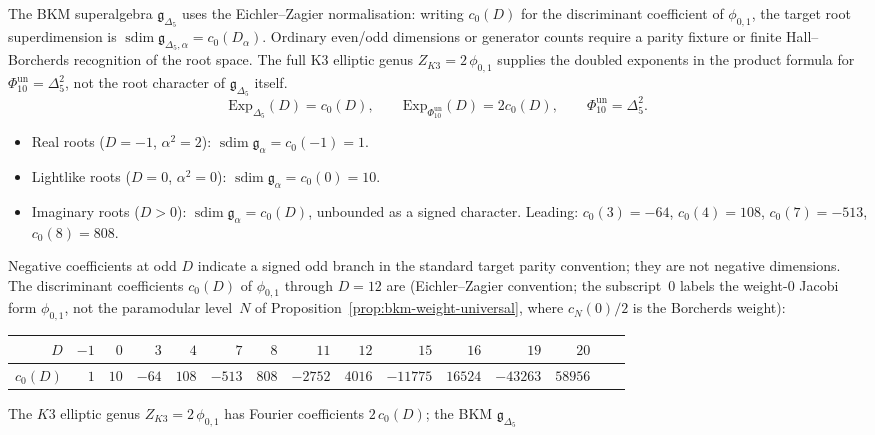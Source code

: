 \begin{proposition}
\label{prop:bkm-roots}
The BKM superalgebra $\mathfrak{g}_{\Delta_5}$ uses the
Eichler--Zagier normalisation: writing $c_0(D)$ for the
discriminant coefficient of $\phi_{0,1}$, the target root
superdimension is
\(\operatorname{sdim}\mathfrak g_{\Delta_5,\alpha}=c_0(D_\alpha)\).
Ordinary even/odd dimensions or generator counts require a parity fixture
or finite Hall--Borcherds recognition of the root space. The full K3 elliptic genus
$Z_{K3}=2\,\phi_{0,1}$ supplies the doubled exponents in the
product formula for \(\Phi_{10}^{\mathrm{un}}=\Delta_5^2\), not the root
character of $\mathfrak g_{\Delta_5}$ itself.
\[
 \mathrm{Exp}_{\Delta_5}(D)=c_0(D),
 \qquad
 \mathrm{Exp}_{\Phi_{10}^{\mathrm{un}}}(D)=2c_0(D),
 \qquad
 \Phi_{10}^{\mathrm{un}}=\Delta_5^2.
\]
\begin{itemize}
\item Real roots ($D = -1$, $\alpha^2 = 2$):
 \(\operatorname{sdim}\mathfrak g_\alpha = c_0(-1) = 1\).
\item Lightlike roots ($D = 0$, $\alpha^2 = 0$):
 \(\operatorname{sdim}\mathfrak g_\alpha = c_0(0) = 10\).
\item Imaginary roots ($D > 0$):
 \(\operatorname{sdim}\mathfrak g_\alpha = c_0(D)\), unbounded as a
 signed character.
 Leading: $c_0(3) = -64$, $c_0(4) = 108$,
 $c_0(7) = -513$, $c_0(8) = 808$.
\end{itemize}
Negative coefficients at odd $D$ indicate a signed odd branch in the
standard target parity convention; they are not negative dimensions. The discriminant coefficients
$c_0(D)$ of $\phi_{0,1}$ through $D = 12$ are
\textup{(}Eichler--Zagier convention; the subscript~$0$ labels
the weight-$0$ Jacobi form $\phi_{0,1}$, not the paramodular
level~$N$ of Proposition~\ref{prop:bkm-weight-universal},
where $c_N(0)/2$ is the Borcherds weight\textup{)}:
\begin{center}
\small
\renewcommand{\arraystretch}{1.2}
\begin{tabular}{r|rrrrrrrrrrrrrr}
$D$ & $-1$ & $0$ & $3$ & $4$ & $7$ & $8$
 & $11$ & $12$ & $15$ & $16$ & $19$ & $20$ \\
\hline
$c_0(D)$ & $1$ & $10$ & $-64$ & $108$ & $-513$ & $808$
 & $-2752$ & $4016$ & $-11775$ & $16524$ & $-43263$ & $58956$
\end{tabular}
\end{center}
The $K3$ elliptic genus $Z_{K3} = 2\,\phi_{0,1}$ has Fourier
coefficients $2\,c_0(D)$; the BKM $\mathfrak{g}_{\Delta_5}$

\end{proposition}
